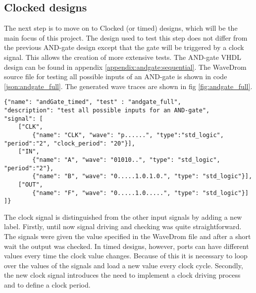 \subsection{Clocked designs}
The next step is to move on to Clocked (or timed) designs, which will be the main focus of this project. The design used to test this step does not differ from the previous AND-gate design except that the gate will be triggered by a clock signal. This allows the creation of more extensive tests. The AND-gate VHDL design can be found in appendix \ref{appendix:andgate:sequential}.
\npar
The WaveDrom source file for testing all possible inputs of an AND-gate is shown in code \ref{json:andgate_full}. The generated wave traces are shown in fig \ref{fig:andgate_full}.
\begin{lstlisting}[style=json, caption={JSON source file for a full AND-gate test}, label={json:andgate_full}]
{"name": "andGate_timed", "test" : "andgate_full", 
"description": "test all possible inputs for an AND-gate", 
"signal": [
	["CLK",
		{"name": "CLK", "wave": "p......", "type":"std_logic", "period":"2", "clock_period": "20"}],
	["IN",
		{"name": "A", "wave": "01010..", "type": "std_logic", "period":"2"},
		{"name": "B", "wave": "0.....1.0.1.0.", "type": "std_logic"}],
	["OUT",
		{"name": "F", "wave": "0.....1.0.....", "type": "std_logic"}]
]}
\end{lstlisting}\clearpage
{}\noindent
The clock signal is distinguished from the other input signals by adding a new label.
\npar
Firstly, until now signal driving and checking was quite straightforward. The signals were given the value specified in the WaveDrom file and after a short wait the output was checked. In timed designs, however, ports can have different values every time the clock value changes. Because of this it is necessary to loop over the values of the signals and load a new value every clock cycle.
\npar
Secondly, the new clock signal introduces the need to implement a clock driving process and to define a clock period. 
